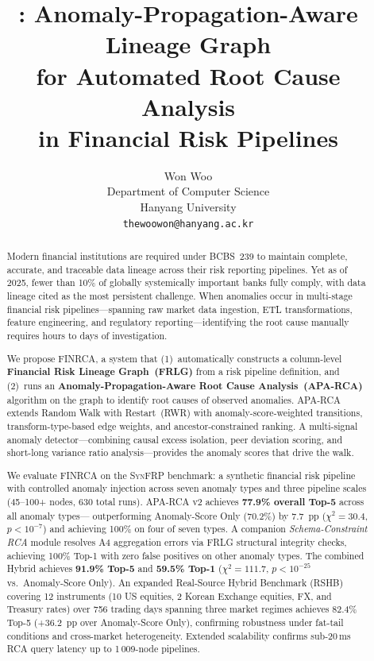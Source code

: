 \documentclass{article}
\title{\finrca: Anomaly-Propagation-Aware Lineage Graph\\
       for Automated Root Cause Analysis\\
       in Financial Risk Pipelines}
\author{%
  Won Woo \\
  Department of Computer Science \\
  Hanyang University \\
  \texttt{thewoowon@hanyang.ac.kr}
}
\newcommand{\finrca}{\textsc{FINRCA}}
\newcommand{\aparca}{\textsc{APA-RCA}}
\newcommand{\synfrp}{\textsc{SynFRP}}
\begin{document}
\maketitle

\begin{abstract}
Modern financial institutions are required under BCBS~239 to maintain
complete, accurate, and traceable data lineage across their risk reporting
pipelines.
Yet as of 2025, fewer than 10\% of globally systemically important banks
fully comply, with data lineage cited as the most persistent challenge.
When anomalies occur in multi-stage financial risk pipelines---spanning raw
market data ingestion, ETL transformations, feature engineering, and
regulatory reporting---identifying the root cause manually requires hours to
days of investigation.

We propose \finrca{}, a system that (1)~automatically constructs a
column-level \textbf{Financial Risk Lineage Graph~(FRLG)} from a risk pipeline
definition, and (2)~runs an \textbf{Anomaly-Propagation-Aware Root Cause
Analysis~(APA-RCA)} algorithm on the graph to identify root causes of observed
anomalies.
\aparca{} extends Random Walk with Restart~(RWR) with anomaly-score-weighted
transitions, transform-type-based edge weights, and ancestor-constrained
ranking.
A multi-signal anomaly detector---combining causal excess isolation, peer
deviation scoring, and short-long variance ratio analysis---provides the
anomaly scores that drive the walk.

We evaluate \finrca{} on the \synfrp{} benchmark: a synthetic financial risk
pipeline with controlled anomaly injection across seven anomaly types and three
pipeline scales (45--100+ nodes, 630 total runs).
\aparca{} v2 achieves \textbf{77.9\% overall Top-5} across all anomaly types---
outperforming Anomaly-Score Only (70.2\%) by 7.7~pp ($\chi^2=30.4$, $p<10^{-7}$)
and achieving 100\% on four of seven types.
A companion \emph{Schema-Constraint RCA} module resolves A4 aggregation errors
via FRLG structural integrity checks, achieving 100\% Top-1 with zero false
positives on other anomaly types.
The combined Hybrid achieves \textbf{91.9\% Top-5} and \textbf{59.5\% Top-1}
($\chi^2=111.7$, $p<10^{-25}$ vs.\ Anomaly-Score Only).
An expanded Real-Source Hybrid Benchmark (RSHB) covering 12 instruments
(10 US equities, 2 Korean Exchange equities, FX, and Treasury rates) over 756
trading days spanning three market regimes achieves 82.4\% Top-5
(+36.2~pp over Anomaly-Score Only), confirming robustness under
fat-tail conditions and cross-market heterogeneity.
Extended scalability confirms sub-20\,ms RCA query latency up to 1\,009-node pipelines.
\end{abstract}
\end{document}
